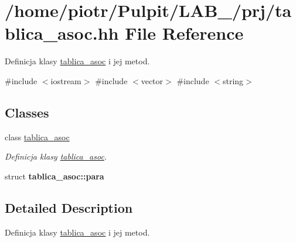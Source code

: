 \hypertarget{tablica__asoc_8hh}{\section{/home/piotr/\-Pulpit/\-L\-A\-B\-\_/prj/tablica\-\_\-asoc.hh \-File \-Reference}
\label{tablica__asoc_8hh}
}


\-Definicja klasy \hyperlink{classtablica__asoc}{tablica\-\_\-asoc} i jej metod.  


{\ttfamily \#include $<$iostream$>$}\*
{\ttfamily \#include $<$vector$>$}\*
{\ttfamily \#include $<$string$>$}\*
\subsection*{\-Classes}
\begin{DoxyCompactItemize}
\item 
class \hyperlink{classtablica__asoc}{tablica\-\_\-asoc}
\begin{DoxyCompactList}\small\item\em \-Definicja klasy \hyperlink{classtablica__asoc}{tablica\-\_\-asoc}. \end{DoxyCompactList}\item 
struct {\bfseries tablica\-\_\-asoc\-::para}
\end{DoxyCompactItemize}


\subsection{\-Detailed \-Description}
\-Definicja klasy \hyperlink{classtablica__asoc}{tablica\-\_\-asoc} i jej metod. 